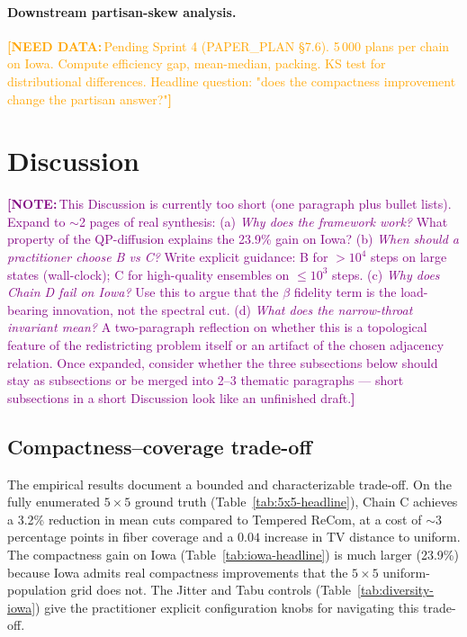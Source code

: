 \documentclass[11pt]{article}
\newcommand{\needdata}[1]{\textcolor{orange}{\textbf{[NEED DATA:}\,#1\textbf{]}}}
\newcommand{\note}[1]{\textcolor{purple}{\textbf{[NOTE:}\,#1\textbf{]}}}
\begin{document}
\paragraph{Downstream partisan-skew analysis.}\label{sec:exp-skew}
\needdata{Pending Sprint 4 (PAPER\_PLAN \S7.6). 5\,000 plans per chain
on Iowa. Compute efficiency gap, mean-median, packing. KS test for
distributional differences. Headline question: "does the compactness
improvement change the partisan answer?"}

\section{Discussion}\label{sec:discussion}

\note{This Discussion is currently too short (one paragraph plus bullet
lists). Expand to $\sim$2 pages of real synthesis:
(a) \emph{Why does the framework work?} What property of the
QP-diffusion explains the 23.9\% gain on Iowa?
(b) \emph{When should a practitioner choose B vs C?} Write explicit
guidance: B for $> 10^4$ steps on large states (wall-clock); C for
high-quality ensembles on $\le 10^3$ steps.
(c) \emph{Why does Chain D fail on Iowa?} Use this to argue that the
$\beta$ fidelity term is the load-bearing innovation, not the
spectral cut.
(d) \emph{What does the narrow-throat invariant mean?} A
two-paragraph reflection on whether this is a topological feature of
the redistricting problem itself or an artifact of the chosen
adjacency relation.
Once expanded, consider whether the three subsections below should
stay as subsections or be merged into 2--3 thematic paragraphs ---
short subsections in a short Discussion look like an unfinished
draft.}

\subsection{Compactness--coverage trade-off}\label{sec:disc-tradeoff}

The empirical results document a bounded and characterizable trade-off.
On the fully enumerated $5 \times 5$ ground truth
(Table~\ref{tab:5x5-headline}), Chain C achieves a 3.2\% reduction in
mean cuts compared to Tempered ReCom, at a cost of $\sim 3$ percentage
points in fiber coverage and a $0.04$ increase in TV distance to
uniform. The compactness gain on Iowa
(Table~\ref{tab:iowa-headline}) is much larger (23.9\%) because Iowa
admits real compactness improvements that the $5 \times 5$ uniform-population
grid does not. The Jitter and Tabu controls
(Table~\ref{tab:diversity-iowa}) give the practitioner explicit
configuration knobs for navigating this trade-off.
\end{document}
